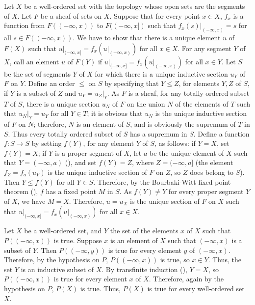 \documentclass{article}
\begin{document}
\begin{solution}
  \label{sol:uutctwo0}
  Let \(X\) be a well-ordered set with the topology whose open sets
  are the segments of \(X\).  Let \(F\) be a sheaf of sets on \(X\).
  Suppose that for every point \(x \in X\), \(f_x\) is a function from
  \(F((-\infty, x))\) to \(F((-\infty, x])\) such that
  \(f_x(s) \vert_{(-\infty, x)} = s\) for all
  \(s \in F((-\infty, x))\).  We have to show that there is a unique
  element \(u\) of \(F(X)\) such that
  \(u \vert_{(-\infty, x]} = f_x(u \vert_{(-\infty, x)})\) for all
  \(x \in X\).  For any segment \(Y\) of \(X\), call an element \(u\)
  of \(F(Y)\)  if
  \(u \vert_{(-\infty, x]} = f_x(u \vert_{(-\infty, x)})\) for all
  \(x \in Y\).  Let \(S\) be the set of segments \(Y\) of \(X\) for
  which there is a unique inductive section \(u_Y\) of \(F\) on \(Y\).
  Define an order \(\leq\) on \(S\) by specifying that \(Y \leq Z\),
  for elements \(Y, Z\) of \(S\), if \(Y\) is a subset of \(Z\) and
  \(u_Y = u_Z \vert_Y\).  As \(F\) is a sheaf, for any totally ordered
  subset \(T\) of \(S\), there is a unique section \(u_N\) of \(F\) on
  the union \(N\) of the elements of \(T\) such that
  \(u_N \vert_Y = u_Y\) for all \(Y \in T\); it is obvious that
  \(u_N\) is the unique inductive section of \(F\) on \(N\);
  therefore, \(N\) is an element of \(S\), and is obviously the
  supremum of \(T\) in \(S\).  Thus every totally ordered subset of
  \(S\) has a supremum in \(S\).  Define a function \(f : S \to S\) by
  setting \(f(Y)\), for any element \(Y\) of \(S\), as follows: if
  \(Y = X\), set \(f(Y) = X\); if \(Y\) is a proper segment of \(X\),
  let \(a\) be the unique element of \(X\) such that
  \(Y = (-\infty, a)\) (), and set \(f(Y) = Z\),
  where \(Z = (-\infty, a]\) (the element \(f_Z = f_a(u_Y)\) is the
  unique inductive section of \(F\) on \(Z\), so \(Z\) does belong to
  \(S\)).  Then \(Y \leq f(Y)\) for all \(Y \in S\).  Therefore, by
  the Bourbaki-Witt fixed point theorem (), \(f\)
  has a fixed point \(M\) in \(S\).  As \(f(Y) \neq Y\) for every
  proper segment \(Y\) of \(X\), we have \(M = X\).  Therefore,
  \(u = u_X\) is the unique section of \(F\) on \(X\) such that
  \(u \vert_{(-\infty, x]} = f_x(u \vert_{(-\infty, x)})\) for all
  \(x \in X\).
\end{solution}

\begin{solution}[\ref{exe:wtzok6gt}]
  \label{sol:649nfcfb}
  Let \(X\) be a well-ordered set, and \(Y\) the set of the elements
  \(x\) of \(X\) such that \(P((-\infty, x))\) is true.  Suppose \(x\)
  is an element of \(X\) such that \((-\infty, x)\) is a subset of
  \(Y\).  Then \(P((-\infty, y))\) is true for every element \(y\) of
  \((-\infty, x)\).  Therefore, by the hypothesis on \(P\),
  \(P((-\infty, x))\) is true, so \(x \in Y\).  Thus, the set \(Y\) is
  an inductive subset of \(X\).  By transfinite induction
  (), \(Y = X\), so \(P((-\infty, x))\) is true for
  every element \(x\) of \(X\).  Therefore, again by the hypothesis on
  \(P\), \(P(X)\) is true.  Thus, \(P(X)\) is true for every
  well-ordered set \(X\).
\end{solution}
\end{document}
